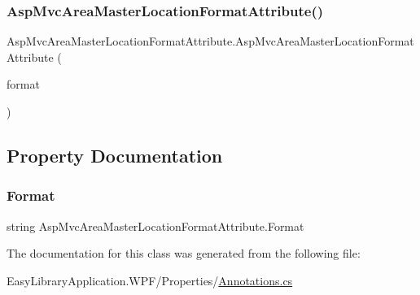 \subsubsection{\texorpdfstring{Asp\+Mvc\+Area\+Master\+Location\+Format\+Attribute()}{AspMvcAreaMasterLocationFormatAttribute()}}
{\footnotesize\ttfamily Asp\+Mvc\+Area\+Master\+Location\+Format\+Attribute.\+Asp\+Mvc\+Area\+Master\+Location\+Format\+Attribute (\begin{DoxyParamCaption}\item[{\mbox{[}\+Not\+Null\mbox{]} string}]{format }\end{DoxyParamCaption})}



\subsection{Property Documentation}
\mbox{\label{class_asp_mvc_area_master_location_format_attribute_a4cb37b1a8f40ba0e5285cd1e602cf1c3}} 
\subsubsection{\texorpdfstring{Format}{Format}}
{\footnotesize\ttfamily string Asp\+Mvc\+Area\+Master\+Location\+Format\+Attribute.\+Format\hspace{0.3cm}{\ttfamily [get]}}



The documentation for this class was generated from the following file\+:\begin{DoxyCompactItemize}
\item 
Easy\+Library\+Application.\+W\+P\+F/\+Properties/\mbox{\hyperlink{_annotations_8cs}{Annotations.\+cs}}\end{DoxyCompactItemize}
